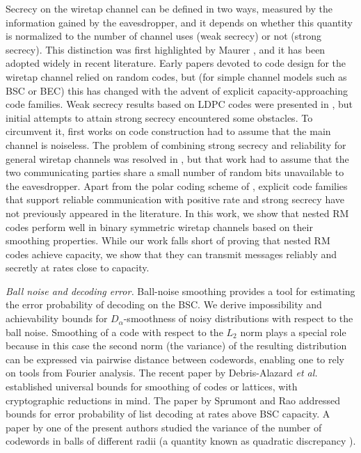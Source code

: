 \documentclass{amsart}
\theoremstyle{remark}
\begin{document}
Secrecy on the wiretap channel can be defined in two ways, measured by the information gained by the eavesdropper, and it depends on whether this quantity is normalized to the number of channel uses (weak secrecy) or not (strong secrecy). This distinction
was first highlighted by Maurer \cite{maurer1993secret}, and it has been adopted widely in recent literature. 
Early papers devoted to code design for the wiretap channel relied on random codes, but (for simple channel models such as BSC or 
BEC) this has changed with the advent of explicit capacity-approaching code families. Weak secrecy results based on LDPC codes were 
presented in \cite{thangaraj2007applications}, but initial attempts to attain strong secrecy encountered some obstacles. 
To circumvent it, first works on code construction \cite{Subramanian2010,mahdavifar2011achieving} had to assume that the main channel
is noiseless. The problem of combining strong secrecy and reliability for general wiretap channels was resolved in 
\cite{gulcu2016achieving}, but that work had to assume that the two communicating parties share a small number of random bits unavailable to the eavesdropper. Apart from the polar coding scheme of \cite{gulcu2016achieving}, explicit code families that 
support reliable communication with positive rate and strong secrecy have not previously appeared in the literature. In this work, we show that nested RM codes perform well in binary symmetric wiretap channels based on their smoothing 
properties. While our work falls short of proving that nested RM codes achieve capacity, we show 
that they can transmit messages reliably and secretly at rates close to capacity.  

\vspace*{.05in}\emph{Ball noise and decoding error.} Ball-noise smoothing provides a tool for estimating the error probability of decoding on the BSC. We derive impossibility and achievability bounds for $D_{\alpha}$-smoothness of noisy distributions with respect to the ball noise. Smoothing of a code with respect to the $L_2$ norm plays a special role because in this case the second norm (the variance) of the resulting distribution can be expressed via pairwise distance between codewords, enabling one to rely on tools from 
Fourier analysis. The recent paper by Debris-Alazard \textit{et al.} \cite{debris2023smoothing} established universal bounds for smoothing of codes or lattices, with cryptographic reductions in mind. The paper by Sprumont and Rao 
\cite{rao2022criterion} addressed bounds for error probability of list decoding at rates above BSC capacity. A paper by one of the present authors \cite{barg2021stolarsky} studied the variance of the number of codewords in balls of different radii (a quantity known as quadratic discrepancy \cite{Bilyk2018,Skriganov2019}).
\end{document}

